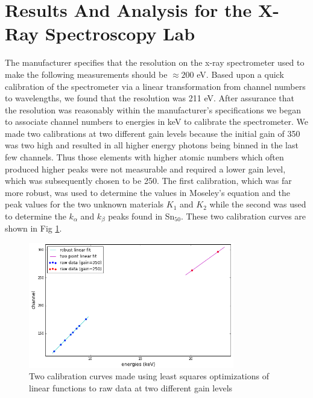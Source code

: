 \documentclass[prb,preprint]{revtex4-1}
\begin{document}
\section{Results And Analysis for the X-Ray Spectroscopy Lab}

The manufacturer specifies that the resolution on the x-ray spectrometer used to make the following measurements should be $\approx200$ eV. Based upon a quick calibration of the spectrometer via a linear transformation from channel numbers to wavelengths, we found that the resolution was 211 eV. After assurance that the resolution was reasonably within the manufacturer's specifications we began to associate channel numbers to energies in keV to calibrate the spectrometer. We made two calibrations at two different gain levels because the initial gain of 350 was two high and resulted in all higher energy photons being binned in the last few channels. Thus those elements with higher atomic numbers which often produced higher peaks were not measurable and required a lower gain level, which was subsequently chosen to be 250. The first calibration, which was far more robust, was used to determine the values in Moseley's equation and the peak values for the two unknown materials $K_1$ and $K_2$ while the second was used to determine the $k_\alpha$ and $k_\beta$ peaks found in Sn$_{50}$. These two calibration curves are shown in Fig \ref{calib}.

\begin{figure}[h]
\centering
\includegraphics[width=0.8\textwidth]{calibration.png}
\caption{Two calibration curves made using least squares optimizations of linear functions to raw data at two different gain levels}
\label{calib}
\end{figure}

\newpage
\end{document}
